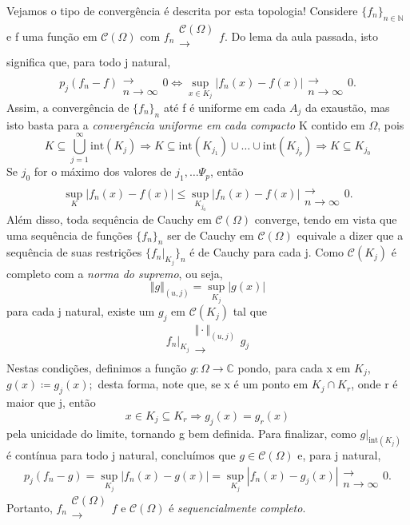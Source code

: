\documentclass[../distribution_theory_notes.tex]{subfiles}
\begin{document}
\begin{example}
	Vejamos o tipo de convergência é descrita por esta topologia! Considere \(\{f_{n}\}_{n\in \mathbb{N}}\) e f uma função em \(\mathcal{C}(\Omega )\) com \(f_{n}\substack{\mathcal{C}(\Omega ) \\ \rightarrow \\ }f\). Do lema da aula passada, isto significa que, para todo j natural,
	\[
		p_{j}(f_{n}-f)\substack{ \\ \rightarrow \\ n\to \infty}0 \Leftrightarrow \sup_{x\in K_{j}}|f_{n}(x)-f(x)|\substack{ \\ \rightarrow \\ n\to \infty}0.
	\]
	Assim, a convergência de \(\{f_{n}\}_{n}\) até f é uniforme em cada \(A_{j}\) da exaustão, mas isto basta para a \textit{convergência uniforme em cada compacto} K contido em \(\Omega \), pois
	\[
		K\subseteq \bigcup_{j=1}^{\infty}\mathrm{int}(K_{j})\Rightarrow K\subseteq \mathrm{int}(K_{j_1})\cup \dotsc \cup \mathrm{int}(K_{j_p})\Rightarrow K\subseteq K_{j_{0}}
	\]
	Se \(j_{0}\) for o máximo dos valores de \(j_1,\dotsc \Psi _{p}\), então
	\[
		\sup_{K}|f_{n}(x)-f(x)|\leq \sup_{K_{j_{0}}}|f_{n}(x)-f(x)|\substack{ \\ \rightarrow \\ n\to \infty}0.
	\]
	Além disso, toda sequência de Cauchy em \(\mathcal{C}(\Omega )\) converge, tendo em vista que uma sequência de funções \(\{f_{n}\}_{n}\) ser de Cauchy em \(\mathcal{C}(\Omega )\) equivale a dizer que a sequência de suas restrições \(\{f_{n}|_{K_{j}}\}_{n}\) é de Cauchy para cada j. Como \(\mathcal{C}(K_{j})\) é completo com a \textit{norma do supremo}, ou seja,
	\[
		\Vert g \Vert_{(u, j)}=\sup_{K_{j}}|g(x)|
	\]
	para cada j natural, existe um \(g_{j}\) em \(\mathcal{C}(K_{j})\) tal que
	\[
		f_{n}|_{K_{j}}\substack{\Vert \cdot  \Vert_{(u, j)} \\ \rightarrow \\ }g_{j}
	\]
	Nestas condições, definimos a função \(g:\Omega \rightarrow \mathbb{C}\) pondo, para cada x em \(K_{j}\), \(g(x)\coloneqq g_{j}(x);\) desta forma, note que, se x é um ponto em \(K_{j}\cap K_{r}\), onde r é maior que j, então
	\[
		x\in K_{j}\subseteq K_{r}\Rightarrow g_{j}(x)=g_{r}(x)
	\]
	pela unicidade do limite, tornando g bem definida. Para finalizar, como \(g|_{\mathrm{int}(K_{j})}\) é contínua para todo j natural, concluímos que \(g\in \mathcal{C}(\Omega )\) e, para j natural,
	\[
		p_{j}(f_{n}-g)=\sup_{K_{j}}|f_{n}(x)-g(x)|=\sup_{K_{j}}|f_{n}(x)-g_{j}(x)|\substack{ \\ \rightarrow \\ n\to \infty}0.
	\]
	Portanto, \(f_{n}\substack{\mathcal{C}(\Omega ) \\ \rightarrow \\ }f\) e \(\mathcal{C}(\Omega )\) é \textit{sequencialmente completo}.
\end{example}
\end{document}
